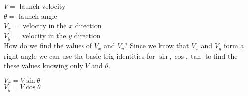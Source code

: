 \documentclass[10pt,a4paper]{article}
\begin{document}
		\noindent
		$V =$ launch velocity \\
		$\theta =$ launch angle \\
		$V_x =$ velocity in the $x$ direction \\
		$V_y =$ velocity in the $y$ direction \\
		
		How do we find the values of $V_x$ and $V_y$?
		Since we know that $V_x$ and $V_y$ form a right angle we can use the basic trig identities for $\sin, \cos, \tan$ to find the these values knowing only $V$ and $\theta$.
		
		$V_x = V \sin\theta$ \\
		$V_y = V \cos\theta$ \\
		
\end{document}

